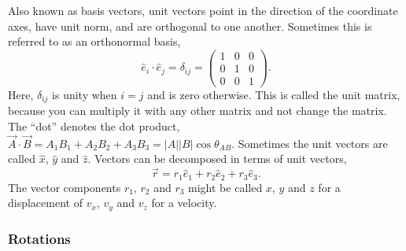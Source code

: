 Also known as basis vectors, unit vectors point in the direction of the coordinate axes, have unit norm, and are orthogonal to one another. Sometimes this is referred to as an orthonormal basis,
\begin{equation}
\hat{e}_i\cdot\hat{e}_j=\delta_{ij}=\left(\begin{array}{ccc}
1 & 0 & 0\\
0& 1 & 0\\
0 & 0 & 1
\end{array}\right).
\end{equation}
Here, $\delta_{ij}$ is unity when $i=j$ and is zero otherwise. This is called the unit matrix, because you can multiply it with any other matrix and not change the matrix. The ``dot'' denotes the dot product, $\vec{A}\cdot\vec{B}=A_1B_1+A_2B_2+A_3B_3=|A||B|\cos\theta_{AB}$. Sometimes the unit vectors are called $\hat{x}$, $\hat{y}$ and $\hat{z}$. Vectors can be decomposed in terms of unit vectors,
\begin{equation}
\vec{r}=r_1\hat{e}_1+r_2\hat{e}_2+r_3\hat{e}_3.
\end{equation}
The vector components $r_1$, $r_2$ and $r_3$ might be called $x$, $y$ and $z$ for a displacement of $v_x$, $v_y$ and $v_z$ for a velocity.

\subsubsection*{Rotations}

